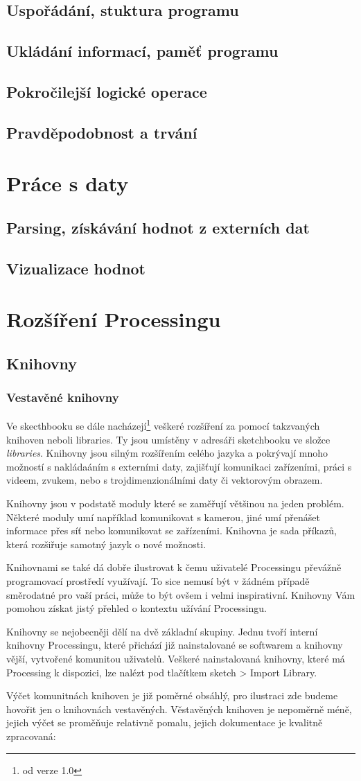 \documentclass[11pt]{book}
\newcommand{\oddil}[1]{\section{#1}\label{sec:#1}}
\newcommand{\pododdil}[1]{\subsection{#1}\label{subsec:#1}}
\begin{document}
\oddil{Uspořádání, stuktura programu}
\oddil{Ukládání informací, paměť programu}
\oddil{Pokročilejší logické operace}

\oddil{Pravděpodobnost a trvání}

\chapter{Práce s daty}

\oddil{Parsing, získávání hodnot z externích dat}
\oddil{Vizualizace hodnot}


\chapter{Rozšíření Processingu}
\oddil{Knihovny}

\pododdil{Vestavěné knihovny}

Ve skecthbooku se dále nacházejí\footnote{od verze 1.0} veškeré rozšíření za pomocí takzvaných knihoven neboli libraries. Ty jsou umístěny v adresáři sketchbooku ve složce {\em libraries}. Knihovny jsou silným rozšířením celého jazyka a pokrývají mnoho možností s nakládaáním s externími daty, zajišťují komunikaci zařízeními, práci s videem, zvukem, nebo s trojdimenzionálními daty či vektorovým obrazem.


Knihovny jsou v podstatě moduly které se zaměřují většinou na jeden problém. Některé moduly umí například komunikovat s kamerou, jiné umí přenášet informace přes síť nebo komunikovat se zařízeními. Knihovna je sada příkazů, která rozšiřuje samotný jazyk o nové možnosti.


Knihovnami se také dá dobře ilustrovat k čemu uživatelé Processingu převážně programovací prostředí využívají. To sice nemusí být v žádném případě směrodatné pro vaší práci, může to být ovšem i velmi inspirativní. Knihovny Vám pomohou získat jistý přehled o kontextu užívání Processingu.

Knihovny se  nejobecněji dělí na dvě základní skupiny. Jednu tvoří interní knihovny Processingu, které přichází již nainstalované se softwarem a knihovny vější, vytvořené komunitou uživatelů. Veškeré nainstalovaná knihovny, které má Processing k dispozici, lze nalézt pod tlačítkem sketch > Import Library.


Výčet komunitnách knihoven je již poměrné obsáhlý, pro ilustraci zde budeme hovořit jen o knihovnách vestavěných. Věstavěných knihoven je nepoměrně méně, jejich výčet se proměňuje relativně pomalu, jejich dokumentace je kvalitně zpracovaná:
\end{document}
